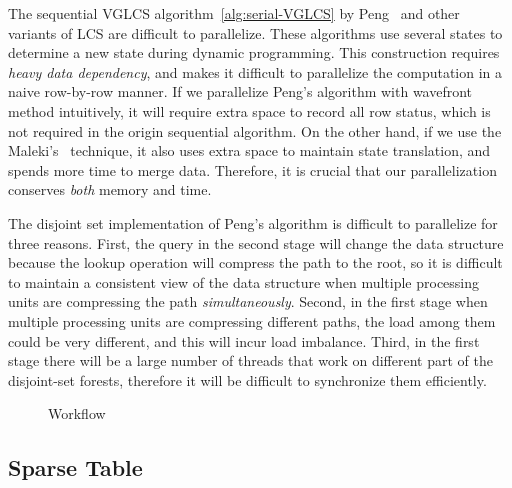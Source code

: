 
The sequential VGLCS algorithm~\ref{alg:serial-VGLCS} by
Peng~\cite{Peng2011TheLC} and other variants of LCS are difficult to
parallelize.  These algorithms use several states to determine a new
state during dynamic programming.  This construction requires {\em
  heavy data dependency}, and makes it difficult to parallelize the
computation in a naive row-by-row manner.  If we parallelize Peng's
algorithm with wavefront method intuitively, it will require extra
space to record all row status, which is not required in the origin
sequential algorithm.  On the other hand, if we use the
Maleki's~\cite{Maleki2016EfficientPU} technique, %
it also uses extra
space to maintain state translation, and spends more time to merge
data.  Therefore, it is crucial that our parallelization conserves
{\em both} memory and time.


The disjoint set implementation of Peng's algorithm is difficult to
parallelize for three reasons.  First, the query in the second stage
will change the data structure because the lookup operation will
compress the path to the root, so it is difficult to maintain a
consistent view of the data structure when multiple processing units
are compressing the path {\em simultaneously}.  Second, in the first
stage when multiple processing units are compressing different paths,
the load among them could be very different, and this will incur load
imbalance.  Third, in the first stage there will be a large number of
threads that work on different part of the disjoint-set forests,
therefore it will be difficult to synchronize them efficiently.


\begin{figure}[!thb]
  \centering
  \caption{Workflow}
\end{figure}

\subsection{Sparse Table}

